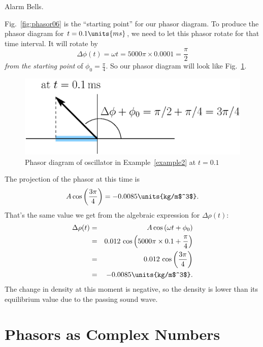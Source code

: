 \begin{exampleb}{Alarm Bells.}
\begin{solution}
Fig.~\ref{fig:phasor06} is the ``starting point'' for our phasor diagram. To
produce the phasor diagram for $t = 0.1\units{ms}$, we need to let
this phasor rotate for that time interval. It will rotate by
\begin{equation}
\Delta \phi(t) = \omega t = 5000\pi\times 0.0001 = \frac{\pi}{2}
\end{equation} 
{\em from the starting point} of $\phi_0 = \frac{\pi}{4}$.
So our phasor diagram will look like Fig.~\ref{fig:phasor07}. %

\begin{figure}\begin{center}
 \includegraphics[width=2.5truein]{phasors/phasor07} 
\caption{\label{fig:phasor07}Phasor diagram of oscillator in
Example~\ref{example2} at $t=0.1$}
\end{center}
\end{figure}

The projection of the phasor at this time is
\begin{equation}
A\cos{\left(\frac{3\pi}{4}\right)} = -0.0085\units{kg/m$^3$}. 
\end{equation}
That's the same value we get from the algebraic expression for 
$\Delta \rho (t)$:
\begin{eqnarray}
\Delta \rho (t) & = & A \cos{\left( \omega t + \phi_0\right)}\nonumber\\
               & = & 0.012\, \cos{\left(5000\pi\times 0.1 
                    + \frac{\pi}{4}\right)} \nonumber\\
               & = & 0.012\, \cos{\left(\frac{3\pi}{4}\right)}\nonumber\\
               & = &  -0.0085\units{kg/m$^3$}.
\end{eqnarray}
The change in density at this moment is negative, so the density is
lower than its equilibrium value due to the passing sound wave.
\end{solution}
\end{exampleb}


\section{Phasors as Complex Numbers}
\label{sec:phasor_complex_notation}

